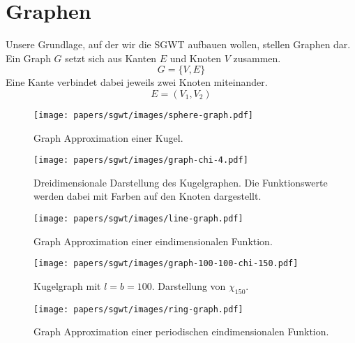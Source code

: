 
\section{Graphen\label{sec:sgwt:graphs}}

Unsere Grundlage, auf der wir die SGWT aufbauen wollen, stellen Graphen dar. 
Ein Graph $G$ setzt sich aus Kanten $E$ und Knoten $V$ zusammen.
\begin{equation*}
G = \{V, E\}
\end{equation*}
Eine Kante verbindet dabei jeweils zwei Knoten miteinander.
\begin{equation*}
E = (V_1, V_2)
\end{equation*}

\begin{figure}
    \centering
    \texttt{[image: papers/sgwt/images/sphere-graph.pdf]}
    \caption{Graph Approximation einer Kugel.
    \label{fig:sgwt:sphere:graph}}
\end{figure}

\begin{figure}
    \centering
    \texttt{[image: papers/sgwt/images/graph-chi-4.pdf]}
    \vspace{-80pt}
    \caption{Dreidimensionale Darstellung des Kugelgraphen. Die Funktionswerte 
    werden dabei mit Farben auf den Knoten dargestellt. 
    \label{fig:sgwt:sphere:graph:chi}}
\end{figure}

\begin{figure}
    \centering
    \texttt{[image: papers/sgwt/images/line-graph.pdf]}
    \vspace{-200pt}
    \caption{Graph Approximation einer eindimensionalen Funktion. 
    \label{fig:sgwt:line:graph}}
\end{figure}

\begin{figure}
    \centering
    \texttt{[image: papers/sgwt/images/graph-100-100-chi-150.pdf]}
    \vspace{-80pt}
    \caption{Kugelgraph mit $l = b = 100$. Darstellung von $\chi_{150}$.
    \label{fig:sgwt:sphere:graph:chi:hh}}
\end{figure}

\begin{figure}
    \centering
    \texttt{[image: papers/sgwt/images/ring-graph.pdf]}
    \caption{Graph Approximation einer periodischen eindimensionalen Funktion. 
    \label{fig:sgwt:ring:graph}}
\end{figure}

